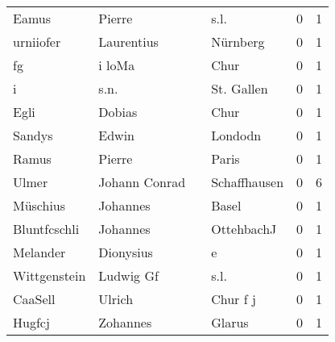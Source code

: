 \begin{tabular}{llllrr}
                    Eamus &                             Pierre &             &                                        s.l. &          0 &         1 \\
                urniiofer &                         Laurentius &             &                                    Nürnberg &          0 &         1 \\
                       fg &                             i loMa &             &                                        Chur &          0 &         1 \\
                        i &                               s.n. &             &                                  St. Gallen &          0 &         1 \\
                     Egli &                             Dobias &             &                                        Chur &          0 &         1 \\
                   Sandys &                              Edwin &             &                                     Londodn &          0 &         1 \\
                    Ramus &                             Pierre &             &                                       Paris &          0 &         1 \\
                    Ulmer &                      Johann Conrad &             &                                Schaffhausen &          0 &         6 \\
                 Müschius &                           Johannes &             &                                       Basel &          0 &         1 \\
             Bluntfcschli &                           Johannes &             &                                  OttehbachJ &          0 &         1 \\
                 Melander &                          Dionysius &             &                                           e &          0 &         1 \\
             Wittgenstein &                          Ludwig Gf &             &                                        s.l. &          0 &         1 \\
                  CaaSell &                             Ulrich &             &                                    Chur f j &          0 &         1 \\
                   Hugfcj &                           Zohannes &             &                                      Glarus &          0 &         1 \\

\end{tabular}
